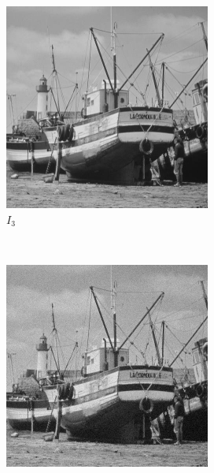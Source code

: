 \documentclass{article}
\begin{document}
\begin{enumerate}[label=(\alph*)]
\begin{figure}[!htb]
        \begin{subfigure}[b]{0.3\textwidth}
            \includegraphics[width=\textwidth]{img/I3.png}
            \caption{$I_3$}
        \end{subfigure}
        ~
        \begin{subfigure}[b]{0.3\textwidth}
            \includegraphics[width=\textwidth]{img/G1.png}

\end{subfigure}
\end{figure}
\end{enumerate}
\end{document}

